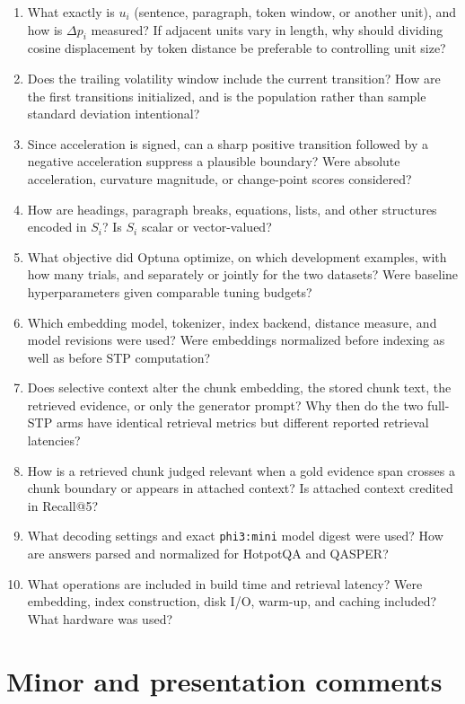 \documentclass[11pt]{article}
\begin{document}
\begin{enumerate}
  \item What exactly is $u_i$ (sentence, paragraph, token window, or another unit), and how is $\Delta p_i$ measured? If adjacent units vary in length, why should dividing cosine displacement by token distance be preferable to controlling unit size?
  \item Does the trailing volatility window include the current transition? How are the first transitions initialized, and is the population rather than sample standard deviation intentional?
  \item Since acceleration is signed, can a sharp positive transition followed by a negative acceleration suppress a plausible boundary? Were absolute acceleration, curvature magnitude, or change-point scores considered?
  \item How are headings, paragraph breaks, equations, lists, and other structures encoded in $S_i$? Is $S_i$ scalar or vector-valued?
  \item What objective did Optuna optimize, on which development examples, with how many trials, and separately or jointly for the two datasets? Were baseline hyperparameters given comparable tuning budgets?
  \item Which embedding model, tokenizer, index backend, distance measure, and model revisions were used? Were embeddings normalized before indexing as well as before STP computation?
  \item Does selective context alter the chunk embedding, the stored chunk text, the retrieved evidence, or only the generator prompt? Why then do the two full-STP arms have identical retrieval metrics but different reported retrieval latencies?
  \item How is a retrieved chunk judged relevant when a gold evidence span crosses a chunk boundary or appears in attached context? Is attached context credited in Recall@5?
  \item What decoding settings and exact \texttt{phi3:mini} model digest were used? How are answers parsed and normalized for HotpotQA and QASPER?
  \item What operations are included in build time and retrieval latency? Were embedding, index construction, disk I/O, warm-up, and caching included? What hardware was used?
\end{enumerate}

\section*{Minor and presentation comments}
\end{document}
